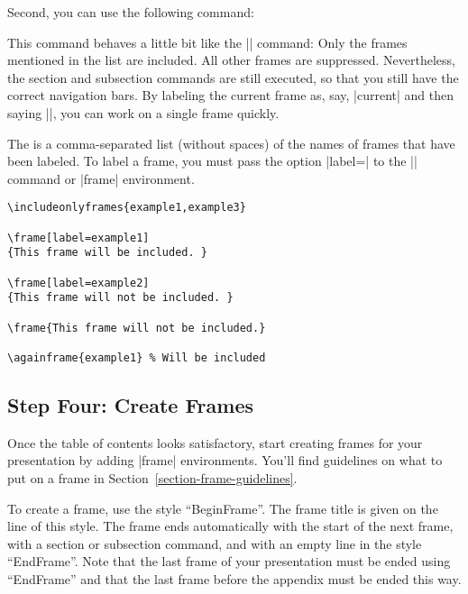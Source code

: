 Second, you can use the following command:

\begin{command}{{}}
  This command behaves a little bit like the || command:
  Only the frames mentioned in the list are included. All other frames
  are suppressed. Nevertheless, the section and subsection commands
  are still executed, so that you still have the correct navigation
  bars. By labeling the current frame as, say, |current| and then
  saying ||, you can work on a single frame
  quickly.

  The  is a comma-separated list (without
  spaces) of the names of frames that have been labeled. To label a
  frame, you must pass the option |label=| to the |\frame|
  command or |frame| environment.

  \example
\begin{verbatim}
\includeonlyframes{example1,example3}

\frame[label=example1]
{This frame will be included. }

\frame[label=example2]
{This frame will not be included. }

\frame{This frame will not be included.}

\againframe{example1} % Will be included
\end{verbatim}
\end{command}



\subsection{Step Four: Create Frames}

Once the table of contents looks satisfactory, start creating frames
for your presentation by adding |frame| environments. You'll find
guidelines on what to put on a frame in
Section~\ref{section-frame-guidelines}.

\lyxnote
To create a frame, use the style ``BeginFrame''. The frame title
is given on the line of this style. The frame ends automatically with
the start of the next frame, with a section or subsection command, and
with an empty line in the style ``EndFrame''. Note that the last frame
of your presentation must be ended using ``EndFrame'' and that the
last frame before the appendix must be ended this way.





